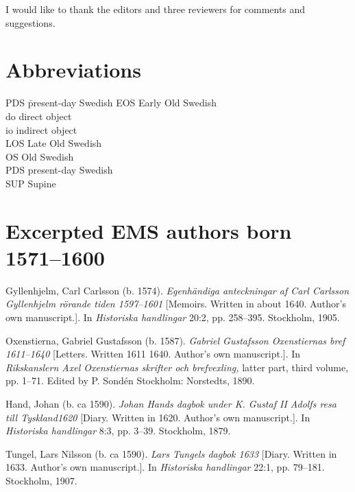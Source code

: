 \documentclass[output=paper]{langscibook}
\begin{document}
I would like to thank the editors and three reviewers for comments and suggestions. 


\section*{Abbreviations}
\begin{multicols}{2}
\begin{tabbing}
PDS\hspace{1ex} \=    present-day Swedish\kill
EOS \>  Early Old Swedish\\
do  \> direct object\\
io  \> indirect object\\
LOS \>  Late Old Swedish\\
OS  \> Old Swedish\\
PDS \>  present-day Swedish\\
SUP \>  Supine
\end{tabbing}
\end{multicols}


\section*{Excerpted EMS authors born 1571–1600}


Gyllenhjelm, Carl Carlsson (b. 1574). \textit{Egenhändiga anteckningar af Carl Carlsson Gyllenhjelm rörande tiden 1597–1601} [Memoirs. Written in about 1640. Author’s own manuscript.]. In \textit{Historiska handlingar} 20:2, pp. 258–395. Stockholm, 1905. 



Oxenstierna, Gabriel Gustafsson (b. 1587). \textit{Gabriel Gustafsson Oxenstiernas bref 1611–1640} [Letters. Written 1611 1640. Author’s own manuscript.]. In \textit{Rikskanslern Axel Oxenstiernas skrifter och brefvexling,} latter part, third volume, pp. 1–71. Edited by P. Sondén Stockholm: Norstedts, 1890. 



Hand, Johan (b. ca 1590). \textit{Johan Hands dagbok under K. Gustaf II Adolfs resa till Tyskland1620} [Diary. Written in 1620. Author’s own manuscript.]. In \textit{Historiska handlingar} 8:3, pp. 3–39. Stockholm, 1879.



Tungel, Lars Nilsson (b. ca 1590). \textit{Lars Tungels dagbok 1633} [Diary. Written in 1633. Author’s own manuscript.]. In \textit{Historiska handlingar} 22:1, pp. 79–181. Stockholm, 1907.
\end{document}
